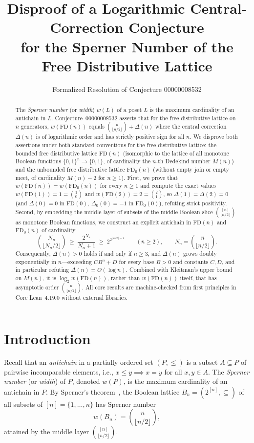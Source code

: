 \documentclass[11pt]{article}
\title{\textbf{Disproof of a Logarithmic Central-Correction Conjecture\\
for the Sperner Number of the Free Distributive Lattice}}
\author{Formalized Resolution of Conjecture 00000008532}
\date{}
\theoremstyle{definition}
\newcommand{\FD}{\mathrm{FD}}
\newcommand{\FDz}{\mathrm{FD}_0}
\begin{document}
\maketitle

\begin{abstract}
The \emph{Sperner number} (or \emph{width}) $w(L)$ of a poset $L$ is the maximum cardinality of an antichain in $L$. Conjecture~00000008532 asserts that for the free distributive lattice on $n$ generators, $w(\FD(n))$ equals $\binom{n}{\lfloor n/2 \rfloor} + \Delta(n)$ where the central correction $\Delta(n)$ is of logarithmic order and has strictly positive sign for all $n$. We disprove both assertions under both standard conventions for the free distributive lattice: the bounded free distributive lattice $\FD(n)$ (isomorphic to the lattice of all monotone Boolean functions $\{0,1\}^n \to \{0,1\}$, of cardinality the $n$-th Dedekind number $M(n)$) and the unbounded free distributive lattice $\FDz(n)$ (without empty join or empty meet, of cardinality $M(n) - 2$ for $n \ge 1$). First, we prove that $w(\FD(n)) = w(\FDz(n))$ for every $n \ge 1$ and compute the exact values $w(\FD(1)) = 1 = \binom{1}{0}$ and $w(\FD(2)) = 2 = \binom{2}{1}$, so $\Delta(1) = \Delta(2) = 0$ (and $\Delta(0) = 0$ in $\FD(0)$, $\Delta_0(0) = -1$ in $\FDz(0)$), refuting strict positivity. Second, by embedding the middle layer of subsets of the middle Boolean slice $\binom{[n]}{\lfloor n/2 \rfloor}$ as monotone Boolean functions, we construct an explicit antichain in $\FD(n)$ and $\FDz(n)$ of cardinality
\[
  \binom{N_n}{\lfloor N_n / 2 \rfloor} \;\ge\; \frac{2^{N_n}}{N_n + 1} \;\ge\; 2^{2^{\lfloor n/2 \rfloor - 1}}
  \qquad (n \ge 2),
  \qquad N_n = \binom{n}{\lfloor n/2 \rfloor}.
\]
Consequently, $\Delta(n) > 0$ holds if and only if $n \ge 3$, and $\Delta(n)$ grows doubly exponentially in $n$---exceeding $C B^n + D$ for every base $B > 0$ and constants $C, D$, and in particular refuting $\Delta(n) = O(\log n)$. Combined with Kleitman's upper bound on $M(n)$, it is $\log_2 w(\FD(n))$, rather than $w(\FD(n))$ itself, that has asymptotic order $\binom{n}{\lfloor n/2 \rfloor}$. All core results are machine-checked from first principles in Core Lean~4.19.0 without external libraries.
\end{abstract}

\section{Introduction}

Recall that an \emph{antichain} in a partially ordered set $(P, \le)$ is a subset $A \subseteq P$ of pairwise incomparable elements, i.e., $x \le y \implies x = y$ for all $x, y \in A$. The \emph{Sperner number} (or \emph{width}) of $P$, denoted $w(P)$, is the maximum cardinality of an antichain in $P$. By Sperner's theorem~\cite{Sperner1928}, the Boolean lattice $B_n = (2^{[n]}, \subseteq)$ of all subsets of $[n] = \{1, \dots, n\}$ has Sperner number
\[
  w(B_n) = \binom{n}{\lfloor n/2 \rfloor},
\]
attained by the middle layer $\binom{[n]}{\lfloor n/2 \rfloor}$.
\end{document}
